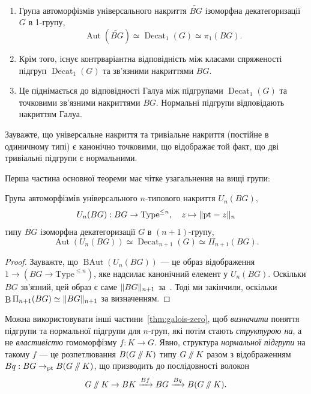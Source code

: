 \documentclass[12pt]{article}
\newcommand*{\pt}{{\mathrm{pt}}}
\newcommand*{\dblslash}{\mathbin{/\kern-3pt/}}
\renewcommand*{\equiv}{\mathrel{\simeq}}
\DeclarePairedDelimiter\trunc{\lVert}{\rVert}
\DeclareMathOperator\Decat{Decat}
\DeclareMathOperator\Aut{Aut}
\DeclareMathOperator\BAut{BAut}
\DeclareMathOperator\B{B}
\newcommand*{\Type}{\mathrm{Type}}
\begin{document}
\begin{theorem}
  \label{thm:galois-zero}
  $\phantom{42}$
  \begin{enumerate}
  \item Група автоморфізмів універсального накриття $\widetilde{BG}$ ізоморфна декатегоризації $G$ в 1-групу,
    \[
      \Aut(\widetilde{BG}) \equiv \Decat_1(G) \equiv \pi_1(BG).
    \]
  \item Крім того, існує контрваріантна відповідність між класами спряженості підгруп $\Decat_1(G)$ та зв'язними накриттями $BG$.
  \item Це піднімається до відповідності Галуа між підгрупами $\Decat_1(G)$ та точковими зв'язними накриттями $BG$. Нормальні підгрупи відповідають накриттям Галуа.
  \end{enumerate}
\end{theorem}

Зауважте, що універсальне накриття та тривіальне накриття (постійне в одиничному типі) є канонічно точковими, що відображає той факт, що дві тривіальні підгрупи є нормальними.

Перша частина основної теореми має чітке узагальнення на вищі групи:

\begin{theorem}
  Група автоморфізмів універсального $n$-типового накриття $U_n(BG)$,
  \[
    U_n(BG) : BG \to \Type^{\le n},
    \quad
    z \mapsto \trunc{\pt = z}_n
  \]
  типу $BG$ ізоморфна декатегоризації $G$ в $(n+1)$-групу,
  \[
    \Aut(U_n(BG)) \equiv \Decat_{n+1}(G) \equiv \Pi_{n+1}(BG).
  \]
\end{theorem}

\begin{proof}
  Зауважте, що $\BAut(U_n(BG))$ — це образ відображення $1 \to (BG \to \Type^{\le n})$, яке надсилає канонічний елемент у $U_n(BG)$. Оскільки $BG$ зв'язний, цей образ є саме $\trunc{BG}_{n+1}$ за~\cite[Теорема~7.1]{joinconstruction}. Тоді ми закінчили, оскільки $\B\Pi_{n+1}(BG) \equiv \trunc{BG}_{n+1}$ за визначенням.
\end{proof}

Можна використовувати інші частини~\autoref{thm:galois-zero}, щоб \emph{визначити} поняття підгрупи та нормальної підгрупи для $n$-груп, які потім стають \emph{структурою на}, а не \emph{властивістю} гомоморфізму $f : K \to G$. Явно, структура \emph{нормальної підгрупи} на такому $f$ — це розпетлювання $B(G \dblslash K)$ типу $G \dblslash K$ разом з відображенням $Bq : BG \to_\pt B(G \dblslash K)$, що призводить до послідовності волокон
\begin{equation}\label{eq:normal-fiber-sequence}
  G \dblslash K \to BK \xrightarrow{Bf}{} BG \xrightarrow{Bq}{} B(G \dblslash K).
\end{equation}
\end{document}
